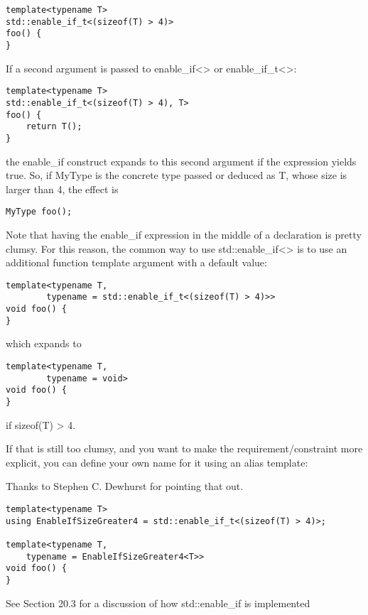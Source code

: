 \begin{lstlisting}[style=styleCXX]
template<typename T>
std::enable_if_t<(sizeof(T) > 4)>
foo() {
}
\end{lstlisting}

If a second argument is passed to enable\_if<> or enable\_if\_t<>:

\begin{lstlisting}[style=styleCXX]
template<typename T>
std::enable_if_t<(sizeof(T) > 4), T>
foo() {
	return T();
}
\end{lstlisting}

the enable\_if construct expands to this second argument if the expression yields true. So, if MyType is the concrete type passed or deduced as T, whose size is larger than 4, the effect is

\begin{lstlisting}[style=styleCXX]
MyType foo();
\end{lstlisting}

Note that having the enable\_if expression in the middle of a declaration is pretty clumsy. For this reason, the common way to use std::enable\_if<> is to use an additional function template argument with a default value:

\begin{lstlisting}[style=styleCXX]
template<typename T,
		typename = std::enable_if_t<(sizeof(T) > 4)>>
void foo() {
}
\end{lstlisting}

which expands to

\begin{lstlisting}[style=styleCXX]
template<typename T,
		typename = void>
void foo() {
}
\end{lstlisting}

if sizeof(T) > 4.

If that is still too clumsy, and you want to make the requirement/constraint more explicit, you can define your own name for it using an alias template:

\begin{tcolorbox}[colback=webgreen!5!white,colframe=webgreen!75!black]
\hspace*{0.75cm}Thanks to Stephen C. Dewhurst for pointing that out.
\end{tcolorbox}

\begin{lstlisting}[style=styleCXX]
template<typename T>
using EnableIfSizeGreater4 = std::enable_if_t<(sizeof(T) > 4)>;

template<typename T,
	typename = EnableIfSizeGreater4<T>>
void foo() {
}
\end{lstlisting}

See Section 20.3 for a discussion of how std::enable\_if is implemented










